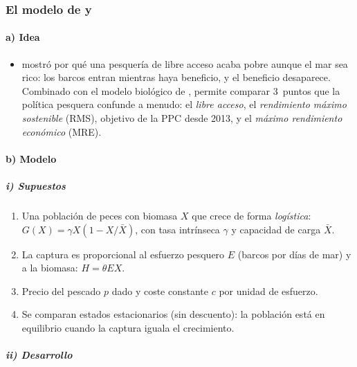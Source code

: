 \documentclass[11pt]{article}
\begin{document}
\subsubsection{El modelo de  y }\label{sec:gordon-schaefer}

\paragraph{a) Idea}

\begin{itemize}
\item \textcite{Gordon1954Economic} mostró por qué una pesquería de libre acceso acaba pobre aunque el mar sea rico: los barcos entran mientras haya beneficio, y el beneficio desaparece. Combinado con el modelo biológico de \textcite{Schaefer1954}, permite comparar 3~puntos que la política pesquera confunde a menudo: el \emph{libre acceso}, el \emph{rendimiento máximo sostenible} (RMS), objetivo de la PPC desde 2013, y el \emph{máximo rendimiento económico} (MRE).
\end{itemize}

\paragraph{b) Modelo}

\subparagraph{i) Supuestos}

\begin{enumerate}
\item Una población de peces con biomasa $X$ que crece de forma \emph{logística}: $G(X)=\gamma X\left(1-X/\bar X\right)$, con tasa intrínseca $\gamma$ y capacidad de carga $\bar X$.
\item La captura es proporcional al esfuerzo pesquero $E$ (barcos por días de mar) y a la biomasa: $H=\theta E X$.
\item Precio del pescado $p$ dado y coste constante $c$ por unidad de esfuerzo.
\item Se comparan estados estacionarios (sin descuento): la población está en equilibrio cuando la captura iguala el crecimiento.
\end{enumerate}

\subparagraph{ii) Desarrollo}
\end{document}
